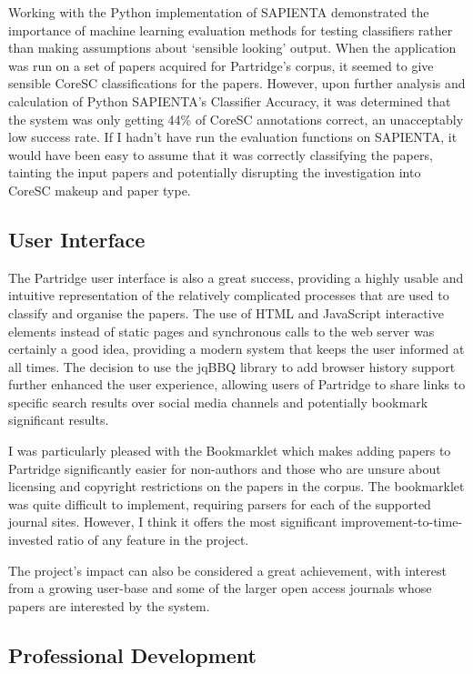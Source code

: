 Working with the Python implementation of SAPIENTA demonstrated the importance
of machine learning evaluation methods for testing classifiers rather than
making assumptions about `sensible looking' output. When the application was
run on a set of papers acquired for Partridge's corpus, it seemed to give
sensible CoreSC classifications for the papers. However, upon further analysis
and calculation of Python SAPIENTA's Classifier Accuracy, it was determined
that the system was only getting 44\% of CoreSC annotations correct, an
unacceptably low success rate. If I hadn't have run the evaluation functions on
SAPIENTA, it would have been easy to assume that it was correctly classifying
the papers, tainting the input papers and potentially disrupting the
investigation into CoreSC makeup and paper type.


\subsection{User Interface}
The Partridge user interface is also a great success, providing a highly usable
and intuitive representation of the relatively complicated processes that are
used to classify and organise the papers. The use of HTML and JavaScript
interactive elements instead of static pages and synchronous calls to the web
server was certainly a good idea, providing a modern system that keeps the user
informed at all times. The decision to use the jqBBQ library to add browser
history support further enhanced the user experience, allowing users of
Partridge to share links to specific search results over social media channels
and potentially bookmark significant results.

I was particularly pleased with the Bookmarklet which makes adding papers to
Partridge significantly easier for non-authors and those who are unsure about
licensing and copyright restrictions on the papers in the corpus. The
bookmarklet was quite difficult to implement, requiring parsers for each of the
supported journal sites. However, I think it offers the most significant
improvement-to-time-invested ratio of any feature in the project.

The project's impact can also be considered a great achievement, with interest
from a growing user-base and some of the larger open access journals whose
papers are interested by the system.

\subsection{Professional Development}

